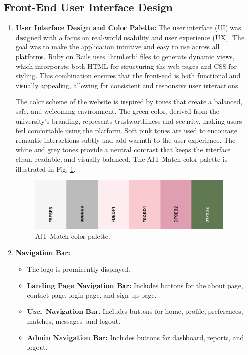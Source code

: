     \subsection{Front-End User Interface Design}
    \begin{enumerate}
        \item \textbf{User Interface Design and Color Palette:}
        The user interface (UI) was designed with a focus on real-world usability and user experience (UX). The goal was to make the application intuitive and easy to use across all platforms. Ruby on Rails uses `.html.erb` files to generate dynamic views, which incorporate both HTML for structuring the web pages and CSS for styling. This combination ensures that the front-end is both functional and visually appealing, allowing for consistent and responsive user interactions.
    
        The color scheme of the website is inspired by tones that create a balanced, safe, and welcoming environment. The green color, derived from the university's branding, represents trustworthiness and security, making users feel comfortable using the platform. Soft pink tones are used to encourage romantic interactions subtly and add warmth to the user experience. The white and grey tones provide a neutral contrast that keeps the interface clean, readable, and visually balanced. The AIT Match color palette is illustrated in Fig. \ref{fig:pantone}.
    
            \begin{figure}[h]
            \centering
            \includegraphics[width=4in]{figures/pantone.png} 
            \captionsetup{justification=centering, singlelinecheck=false, labelsep=space}
            \caption{AIT Match color palette.}
            \label{fig:pantone}
            \end{figure} 

        \item \textbf{Navigation Bar:}
        \begin{itemize}
            \item The logo is prominently displayed.
            \item \textbf{Landing Page Navigation Bar:} Includes buttons for the about page, contact page, login page, and sign-up page.
            \item \textbf{User Navigation Bar:} Includes buttons for home, profile, preferences, matches, messages, and logout.
            \item \textbf{Admin Navigation Bar:} Includes buttons for dashboard, reports, and logout.
        \end{itemize}


\end{enumerate}
